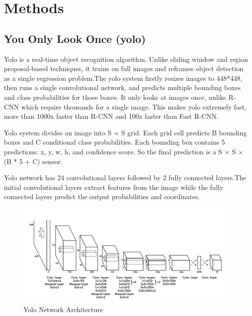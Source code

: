 \section{Methods}

\subsection{You Only Look Once (yolo)}
Yolo is a real-time object recognition algorithm. Unlike sliding window and region proposal-based techniques, it trains on full images and reframes object detection as a single regression problem.The yolo system firstly resizes images to 448*448, then runs a single convolutional network, and predicts multiple bounding boxes and class probabilities for those boxes. It only looks at images once, unlike R-CNN which require thousands for a single image. This makes yolo extremely fast, more than 1000x faster than R-CNN and 100x faster than Fast R-CNN. 

Yolo system divides an image into S × S grid. Each grid cell predicts B bounding boxes and C conditional class probabilities. Each bounding box contains 5 predictions: x, y, w, h, and confidence score. So the final prediction is a S × S × (B * 5 + C) sensor.

Yolo network has 24 convolutional layers followed by 2 fully connected layers.The initial convolutional layers extract features from the image while the fully connected layers predict the output probabilities and coordinates. 
\begin{figure}[H]
    \centering
    \includegraphics[width=1.0\linewidth]{img/yolo_network.png}
    \caption{Yolo Network Architecture}
\end{figure}%


